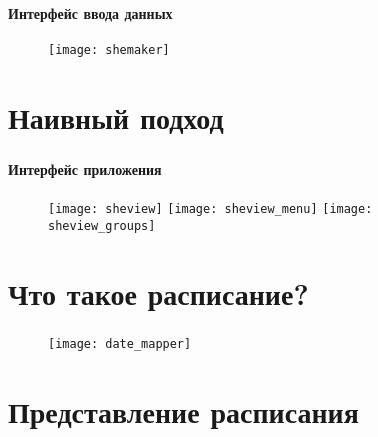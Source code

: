 \begin{frame}
\frametitle{\insertsection}
\framesubtitle{Интерфейс ввода данных}

\begin{figure}
    \center
    \texttt{[image: shemaker]}
\end{figure}
\end{frame}


\section{Наивный подход}

\begin{frame}
\frametitle{\insertsection}
\framesubtitle{Интерфейс приложения}

\begin{figure}[!htb]
        \texttt{[image: sheview]}
    \endminipage\hfill
        \texttt{[image: sheview\_menu]}
    \endminipage\hfill
        \texttt{[image: sheview\_groups]}
    \endminipage
\end{figure}
\end{frame}


\section{Что такое расписание?}

\begin{frame}
\frametitle{\insertsection}

\begin{figure}
    \center
    \texttt{[image: date\_mapper]}
\end{figure}
\end{frame}


\section{Представление расписания}

